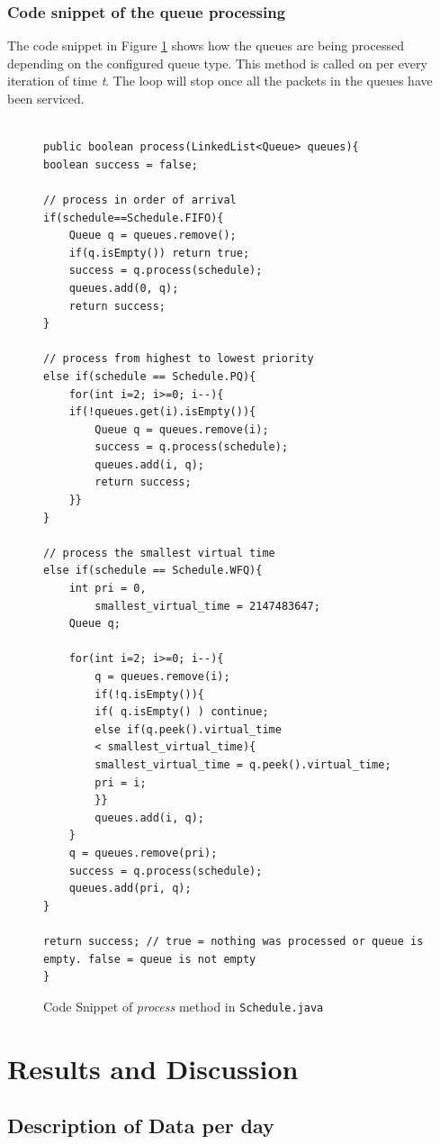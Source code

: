 \documentclass[journal]{IEEE/IEEEtran}
\begin{document}
\subsubsection{Code snippet of the queue processing}
The code snippet in Figure \ref{fig:snippet} shows how the queues are being processed depending on the configured queue type. This method is called on per every iteration of time \textit{t}. The loop will stop once all the packets in the queues have been serviced.
\begin{figure}
\begin{lstlisting}

public boolean process(LinkedList<Queue> queues){
boolean success = false;

// process in order of arrival
if(schedule==Schedule.FIFO){
	Queue q = queues.remove();
	if(q.isEmpty()) return true;
	success = q.process(schedule);
	queues.add(0, q);
	return success;
}

// process from highest to lowest priority
else if(schedule == Schedule.PQ){
	for(int i=2; i>=0; i--){
	if(!queues.get(i).isEmpty()){
		Queue q = queues.remove(i);
		success = q.process(schedule);
		queues.add(i, q);
		return success;
 	}}
}

// process the smallest virtual time
else if(schedule == Schedule.WFQ){
	int pri = 0,
		smallest_virtual_time = 2147483647;
	Queue q;

	for(int i=2; i>=0; i--){
		q = queues.remove(i);
		if(!q.isEmpty()){					
		if( q.isEmpty() ) continue;
		else if(q.peek().virtual_time 
		< smallest_virtual_time){
		smallest_virtual_time = q.peek().virtual_time;
		pri = i;
		}}
		queues.add(i, q);
	}
	q = queues.remove(pri);
	success = q.process(schedule);
	queues.add(pri, q);
}

return success;	// true = nothing was processed or queue is empty. false = queue is not empty
}
\end{lstlisting}
\label{fig:snippet}\caption{Code Snippet of \textit{process} method in \texttt{Schedule.java}}
\end{figure}


\section{Results and Discussion}

\subsection{Description of Data per day}
\end{document}
